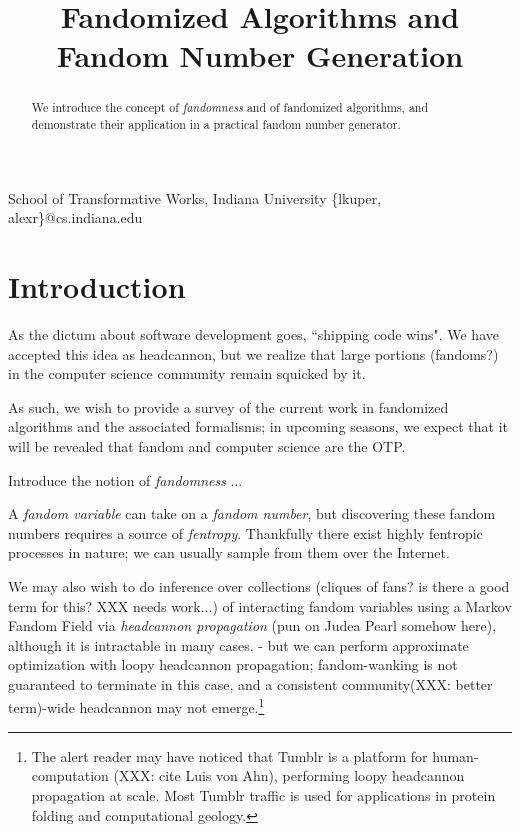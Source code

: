 \documentclass[9pt]{sigplanconf}
\begin{document}
\title{Fandomized Algorithms and Fandom Number Generation}

           {School of Transformative Works, Indiana University}
           {\{lkuper, alexr\}@cs.indiana.edu}

\maketitle

\begin{abstract}
We introduce the concept of \emph{fandomness} and of fandomized algorithms, and
demonstrate their application in a practical fandom number generator.
\end{abstract}

\section{Introduction}
As the dictum about software development goes, ``shipping code wins". We have
accepted this idea as headcannon, but we realize that large portions
(fandoms?) in the computer science community remain squicked by it.

As such, we wish to provide a survey of the current work in fandomized
algorithms and the associated formalisms; in upcoming seasons, we expect that
it will be revealed that fandom and computer science are the OTP.

Introduce the notion of \emph{fandomness} ...

A \emph{fandom variable} can take on a \emph{fandom number}, but discovering
these fandom numbers requires a source of \emph{fentropy}. Thankfully there
exist highly fentropic processes in nature; we can usually sample from them
over the Internet.

We may also wish to do inference over collections (cliques of fans? is there a
good term for this? XXX needs work...) of interacting fandom variables using a
Markov Fandom Field via \emph{headcannon propagation} (pun on Judea Pearl
somehow here), although it is intractable in many cases.
- but we can perform approximate optimization with loopy headcannon
  propagation; fandom-wanking is not guaranteed to terminate in this case, and
  a consistent community(XXX: better term)-wide headcannon may not
  emerge.\footnote{The alert reader may have noticed that Tumblr is a platform
  for human-computation (XXX: cite Luis von Ahn), performing
  loopy headcannon propagation at scale. Most Tumblr traffic is used for
  applications in protein folding and computational geology.}
\end{document}
